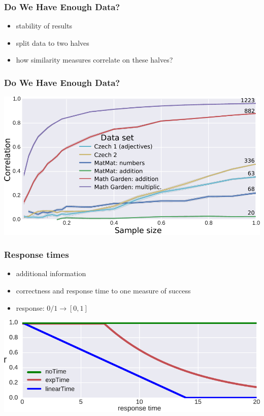\documentclass[xcolor=svgnames]{beamer}
\begin{document}
\begin{frame}
    \frametitle{Do We Have Enough Data?}
    \begin{itemize}
        \item stability of results
        \item split data to two halves
        \item how similarity measures correlate on these halves?
    \end{itemize}
\end{frame}
\begin{frame}
    \frametitle{Do We Have Enough Data?}
    \includegraphics[width=\linewidth]{figures/stability}
\end{frame}
\begin{frame}
    \frametitle{Response times}
    \begin{itemize}
        \item additional information
        \item correctness and response time to one measure of success
        \item response: $0/1 \rightarrow [0,1]$
    \end{itemize}

    \vfill

    \centering
    \includegraphics[width=0.8\linewidth]{figures/time-uses}

\end{frame}
\end{document}
